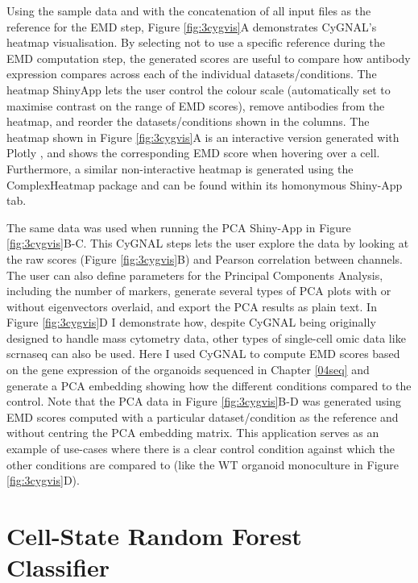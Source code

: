Using the sample data and with the concatenation of all input files as the reference for the EMD step, Figure \ref{fig:3cygvis}A demonstrates CyGNAL's heatmap visualisation. By selecting not to use a specific reference during the EMD computation step, the generated scores are useful to compare how antibody expression compares across each of the individual datasets/conditions. The heatmap ShinyApp lets the user control the colour scale (automatically set to maximise contrast on the range of EMD scores), remove antibodies from the heatmap, and reorder the datasets/conditions shown in the columns. The heatmap shown in Figure \ref{fig:3cygvis}A is an interactive version generated with Plotly \cite{plotly_technologies_inc_collaborative_2015}, and shows the corresponding EMD score when hovering over a cell. Furthermore, a similar non-interactive heatmap is generated using the ComplexHeatmap \cite{gu_complexheatmap_2021} package and can be found within its homonymous Shiny-App tab.

The same data was used when running the PCA Shiny-App in Figure \ref{fig:3cygvis}B-C. This CyGNAL steps lets the user explore the data by looking at the raw scores (Figure \ref{fig:3cygvis}B) and Pearson correlation between channels. The user can also define parameters for the Principal Components Analysis, including the number of markers, generate several types of PCA plots with or without eigenvectors overlaid, and export the PCA results as plain text. In Figure \ref{fig:3cygvis}D I demonstrate how, despite CyGNAL being originally designed to handle mass cytometry data, other types of single-cell omic data like \acrshort{scrnaseq} can also be used. Here I used CyGNAL to compute EMD scores based on the gene expression of the organoids sequenced in Chapter \ref{04seq} and generate a PCA embedding showing how the different conditions compared to the control.
Note that the PCA data in Figure \ref{fig:3cygvis}B-D was generated using EMD scores computed with a particular dataset/condition as the reference and without centring the PCA embedding matrix. This application serves as an example of use-cases where there is a clear control condition against which the other conditions are compared to (like the WT organoid monoculture in Figure \ref{fig:3cygvis}D).

\newpage
\section{Cell-State Random Forest Classifier}

